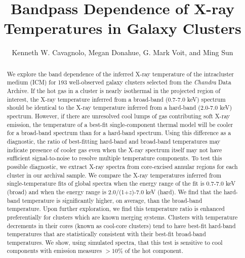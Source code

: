 \documentclass{emulateapj}
\begin{document}
\title{Bandpass Dependence of X-ray Temperatures in Galaxy Clusters}
\author{Kenneth W. Cavagnolo, Megan
Donahue, G. Mark Voit, and Ming
Sun}


\begin{abstract}

We explore the band dependence of the inferred X-ray temperature of
the intracluster medium (ICM) for 193 well-observed galaxy clusters
selected from the {\it Chandra} Data Archive. If
the hot gas in a cluster is nearly isothermal in the projected region
of interest, the X-ray temperature inferred from a broad-band
(0.7-7.0 keV) spectrum should be identical to the X-ray temperature
inferred from a hard-band (2.0-7.0 keV) spectrum. However, if there are
unresolved cool lumps of gas contributing soft X-ray emission, the
temperature of a best-fit single-component thermal model will be
cooler for a broad-band spectrum than for a hard-band spectrum. Using
this difference as a diagnostic, the ratio of best-fitting hard-band
and broad-band temperatures may indicate presence of cooler gas even
when the X-ray spectrum itself may not have sufficient signal-to-noise
to resolve multiple temperature components. To test this possible
diagnostic, we extract X-ray spectra from core-excised annular regions
for each cluster in our archival sample. We compare the X-ray
temperatures inferred from single-temperature fits of global spectra
when the energy range of the fit is 0.7-7.0 keV (broad) and when the
energy range is 2.0/(1+$z$)-7.0 keV (hard). We find that the hard-band
temperature is significantly higher, on average, than the broad-band
temperature. Upon further exploration, we find this temperature ratio
is enhanced preferentially for clusters which are known merging
systems. Clusters with temperature decrements in their cores (known as
cool-core clusters) tend to have best-fit hard-band temperatures that
are statistically consistent with their best-fit broad-band
temperatures. We show, using simulated spectra, that this test is
sensitive to cool components with emission measures $> 10\%$ of the
hot component.
\end{abstract}


\end{document}

